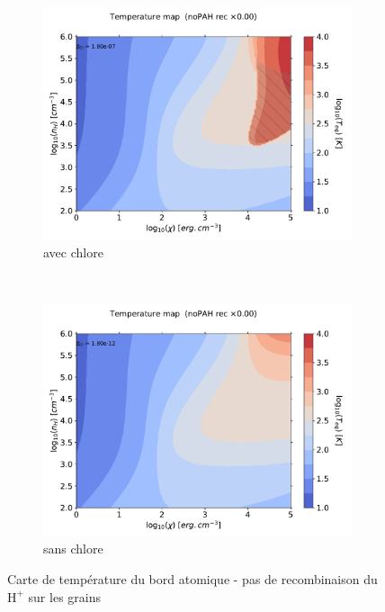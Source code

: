 \begin{figure}[htbp]
    \centering
    \begin{subfigure}[t]{0.45\textwidth} %
        \centering \includegraphics[trim = {0 0 0 1.5cm},clip,width=1\textwidth]{figure/Cl/model/mapG0nHTeq_m6p7_exp_noPAH_1p0PE_OI_CII_ggr_elecrec_lyman_OI.pdf}
        \caption{avec chlore}
    \end{subfigure}
    ~ 
    \begin{subfigure}[t]{0.45\textwidth}
        \centering \includegraphics[trim = {0 0 0 1.5cm},clip,width=1\textwidth]{figure/Cl/model/mapG0nHTeq_m11p7_exp_noPAH_1p0PE_OI_CII_ggr_elecrec_lyman_OI.pdf}
        \caption{sans chlore}
    \end{subfigure}
    \caption{Carte de température du bord atomique - pas de recombinaison du $\mathrm{H}^+$ sur les grains}
    \label{fig:Cl:model:mapT:norec}
\end{figure}

